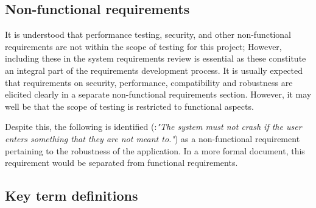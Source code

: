 \subsection{Non-functional requirements}
\label{sec:non-functional-requirements}
It is understood that performance testing, security, and other non-functional requirements are not within the scope of testing for this project;
However, including these in the system requirements review is essential as these constitute an integral part of the requirements development process. It is usually expected that requirements on security, performance, compatibility and robustness are elicited clearly in a separate non-functional requirements section.  However, it may well be that the scope of testing is restricted to functional aspects.
\par
Despite this, the following is identified (\RSeven:\textit{"The system must not crash if the user enters something that they are not meant to."}) as a non-functional requirement pertaining to the robustness of the application. In a more formal document, this requirement would be separated from functional requirements.

%
\par

\subsection{Key term definitions}
\label{sec:key-term-definitions}

